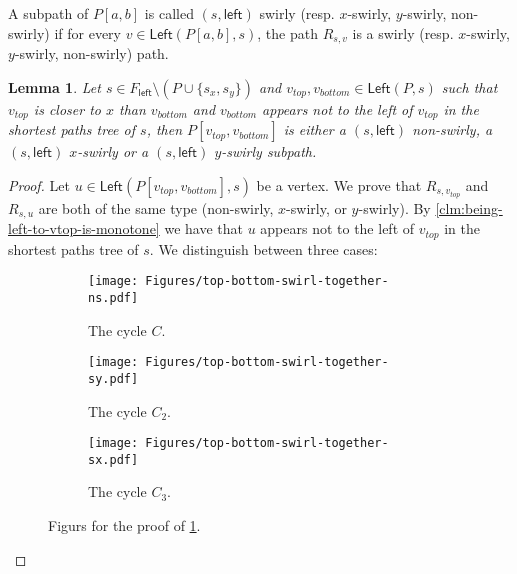 \documentclass{article}
\newcommand{\Left}{\mathsf{Left}}
\newcommand{\leftside}{\mathsf{left}}
\newtheorem{lemma}{Lemma}
\begin{document}
A subpath of $P[a,b]$ is called $(s,\leftside)$ swirly (resp. $x$-swirly, $y$-swirly, non-swirly) if for every $v\in \Left(P[a,b],s)$, the path $R_{s,v}$ is a swirly (resp. $x$-swirly, $y$-swirly, non-swirly) path.

\begin{lemma}\label{lem:top-bottom-swirl-together}
    Let $s\in F_{\leftside}\setminus (P\cup \{s_x,s_y\})$ and $v_{top},v_{bottom}\in \Left(P,s)$ such that $v_{top}$ is closer to $x$ than $v_{bottom}$ and  $v_{bottom}$ appears not to the left of $v_{top}$ in the shortest paths tree of $s$, then   $P[v_{top},v_{bottom}]$  is either a $(s,\leftside)$ non-swirly, a $(s,\leftside)$ $x$-swirly or a $(s,\leftside)$ $y$-swirly subpath.

\end{lemma}
\begin{proof}
Let $u\in \Left(P[v_{top},v_{bottom}],s)$ be a vertex.
We prove that  $R_{s,v_{top}}$ and  $R_{s,u}$ are both of the same type (non-swirly, $x$-swirly, or $y$-swirly).
By \cref{clm:being-left-to-vtop-is-monotone} we have that $u$ appears not to the left of $v_{top}$ in the shortest paths tree of $s$.
We distinguish between three cases:\\

\begin{figure}[ht]
    \centering
    \begin{subfigure}[t]{0.3\textwidth}
        \centering
        \texttt{[image: Figures/top-bottom-swirl-together-ns.pdf]}
        \caption{The cycle $C$.}
        \label{fig:Swirl-S-SX-C1}
    \end{subfigure}
     \hspace{0.2in}
    \begin{subfigure}[t]{0.3\textwidth}
        \centering
        \texttt{[image: Figures/top-bottom-swirl-together-sy.pdf]}
        \caption{The cycle $C_2$.}
        \label{fig:Swirl-S-SX-C2}
    \end{subfigure}
     \hspace{0.2in}
    \begin{subfigure}[t]{0.3\textwidth}
        \centering
        \texttt{[image: Figures/top-bottom-swirl-together-sx.pdf]}
        \caption{The cycle $C_3$.}
        \label{fig:Swirl-S-SX-C3}
    \end{subfigure}
    \caption{Figurs for the proof of  \cref{lem:top-bottom-swirl-together}.}
    \label{fig:top-bottom-swirl-togetherl}
\end{figure}



\end{proof}
\end{document}
